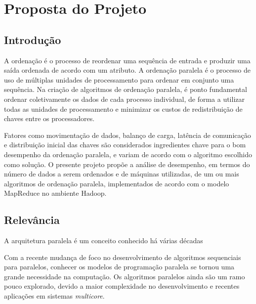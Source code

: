 \chapter{Proposta do Projeto}

\section{Introdução}


A ordenação é o processo de reordenar uma sequência de entrada e produzir uma saída ordenada de acordo com um atributo. 
A ordenação paralela é o processo de uso de múltiplas unidades de processamento para ordenar em conjunto uma sequência. Na criação de algoritmos de ordenação paralela, é ponto fundamental ordenar coletivamente os dados de cada processo individual, de forma a utilizar todas as unidades de processamento e minimizar os custos de redistribuição de chaves entre os processadores. \cite{Kale:2010} 


Fatores como movimentação de dados, balanço de carga, latência de comunicação e distribuição inicial das chaves são considerados ingredientes chave para o bom desempenho da ordenação paralela, e variam de acordo com o algoritmo escolhido como solução. O presente projeto propõe a análise de desempenho, em termos do número de dados a serem ordenados e de máquinas utilizadas, de um ou mais algoritmos de ordenação paralela, implementados de acordo com o modelo MapReduce no ambiente Hadoop.


\section{Relevância}

A arquitetura paralela é um conceito conhecido há várias décadas 

%


Com a recente mudança de foco no desenvolvimento de algoritmos sequenciais para paralelos, conhecer os modelos de programação paralela se tornou uma grande necessidade na computação. Os algoritmos paralelos ainda são um ramo pouco explorado, devido a  maior complexidade no desenvolvimento e recentes aplicações em sistemas \textit{multicore}.


